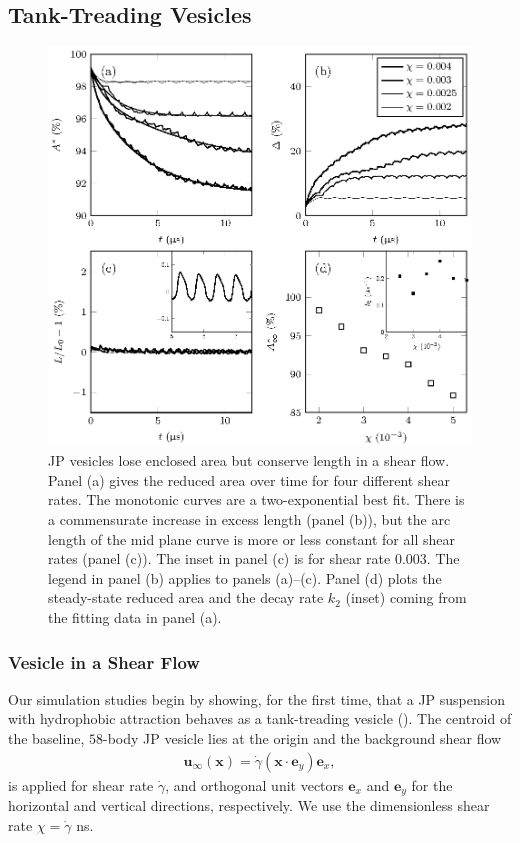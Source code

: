 \documentclass[lineno]{jfm}
\newcommand{\xx}{\mathbf{x}}
\newcommand{\uu}{\mathbf{u}}
\begin{document}
\subsection{Tank-Treading Vesicles}
\begin{figure}
\begin{center}
\includegraphics[width=13.5cm]{fig3.eps}
\end{center} 
  \caption{\label{figure4} JP vesicles lose enclosed area but conserve
  length in a shear flow. Panel (a) gives the reduced area over time for
  four different shear rates. The monotonic curves are a two-exponential
  best fit. There is a commensurate increase in excess length (panel
  (b)), but the arc length of the mid plane curve is more or less
  constant for all shear rates (panel (c)). The inset in panel (c) is
  for shear rate 0.003. The legend in panel (b) applies to panels
  (a)--(c). Panel (d) plots the steady-state reduced area and the decay
  rate $k_2$ (inset) coming from the fitting data in panel (a).}
\end{figure}

\subsubsection{Vesicle in a Shear Flow}
\label{sec:ves_in_shear}
Our simulation studies begin by showing, for the first time, that a JP
suspension with hydrophobic attraction behaves as a tank-treading
vesicle (\cite{Finken08, Shaqfeh11}). The centroid of the baseline,
$58$-body JP vesicle lies at the origin and the background shear flow 
\begin{align}
  \uu_{\infty}(\xx) = \dot\gamma (\xx \cdot \mathbf{e}_y) \mathbf{e}_x,
\end{align} 
is applied for shear rate $\dot\gamma$, and orthogonal unit vectors
$\mathbf{e}_x$ and $\mathbf{e}_y$ for the horizontal and vertical
directions, respectively. We use the dimensionless shear rate $\chi =
\dot \gamma$ ns.
\end{document}
